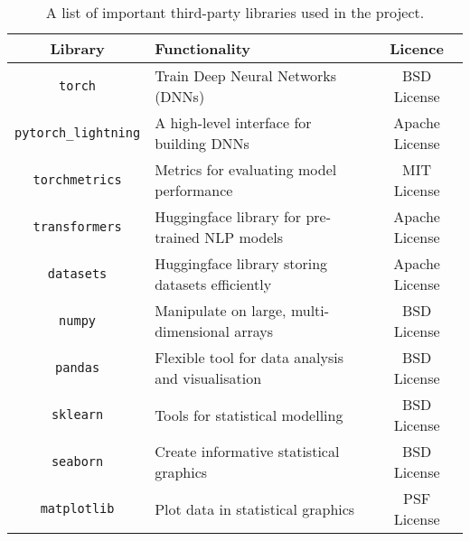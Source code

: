 \begin{table}[!ht]
    \centering
    \begin{tabular}{c|p{8.5cm}|c}
        \toprule
        \textbf{Library} & \textbf{Functionality} & \textbf{Licence} \\
        \midrule
        \texttt{torch} \cite{Paszke19PyTorch} & Train Deep Neural Networks (DNNs) & BSD License \\
        \texttt{pytorch\_lightning} \cite{Falcon19PL} & A high-level interface for building DNNs & Apache License \\
        \texttt{torchmetrics} \cite{Detlefsen22torchmetrics} & Metrics for evaluating model performance & MIT License \\
        \texttt{transformers} \cite{Wolf19hugtransf} & Huggingface library for pre-trained NLP models & Apache License \\
        \texttt{datasets} \cite{lhoest21datasets} & Huggingface library storing datasets efficiently & Apache License\\
        \texttt{numpy} \cite{Harris20NumPy} & Manipulate on large, multi-dimensional arrays & BSD License\\
        \texttt{pandas} \cite{mckinney10Pandas} & Flexible tool for data analysis and visualisation & BSD License\\
        \texttt{sklearn} \cite{pedregosa11scikit} & Tools for statistical modelling & BSD License \\
        \texttt{seaborn} \cite{michael17SEABORN} & Create informative statistical graphics & BSD License\\
        \texttt{matplotlib} \cite{Hunter07Matplotlib} & Plot data in statistical graphics & PSF License\\
         \toprule
    \end{tabular}
    \caption{A list of important third-party libraries used in the project.}
    \label{tab:library}
\end{table}